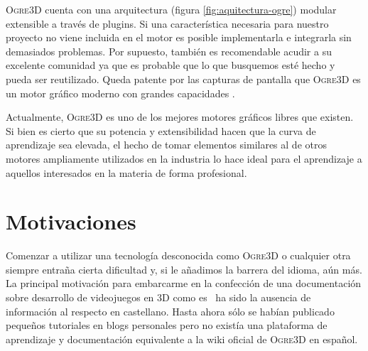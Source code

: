 
\textsc{Ogre3D} cuenta con una arquitectura (figura \ref{fig:aquitectura-ogre})
modular extensible a través de plugins. Si una característica necesaria para
nuestro proyecto no viene incluida en el motor es posible implementarla
e integrarla sin demasiados problemas. Por supuesto, también es recomendable
acudir a su excelente comunidad ya que es probable que lo que busquemos esté
hecho y pueda ser reutilizado. Queda patente por las capturas de pantalla
que \textsc{Ogre3D} es un motor gráfico moderno con grandes capacidades
\cite{junk06}.\\


Actualmente, \textsc{Ogre3D} es uno de los mejores motores gráficos libres
que existen. Si bien es cierto que su potencia y extensibilidad hacen que
la curva de aprendizaje sea elevada, el hecho de tomar elementos similares
al de otros motores ampliamente utilizados en la industria lo hace ideal
para el aprendizaje a aquellos interesados en la materia de forma profesional.\\



\section{Motivaciones}
\label{sec:motivaciones}

Comenzar a utilizar una tecnología desconocida como \textsc{Ogre3D} o cualquier
otra siempre entraña cierta dificultad y, si le añadimos la barrera del 
idioma, aún más. La principal motivación para embarcarme en la confección
de una documentación sobre desarrollo de videojuegos en 3D como es \wiki\
ha sido la ausencia de información al respecto en castellano. Hasta
ahora sólo se habían publicado pequeños tutoriales en blogs personales
pero no existía una plataforma de aprendizaje y documentación
equivalente a la wiki oficial de \textsc{Ogre3D} \cite{website:ogre3d-wiki}
en español.\\

